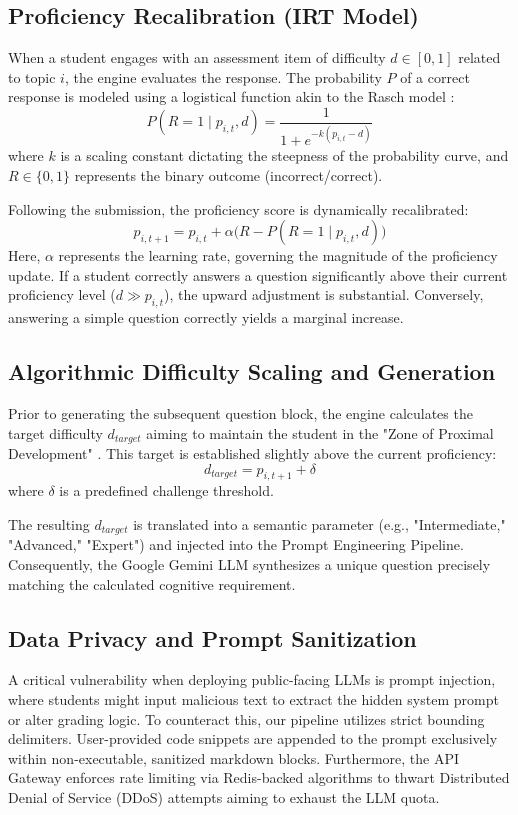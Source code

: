 \documentclass[conference]{IEEEtran}
\begin{document}
\subsection{Proficiency Recalibration (IRT Model)}
When a student engages with an assessment item of difficulty $d \in [0, 1]$ related to topic $i$, the engine evaluates the response. The probability $P$ of a correct response is modeled using a logistical function akin to the Rasch model \cite{van2013item}:
\begin{equation}
P(R=1 \mid p_{i, t}, d) = \frac{1}{1 + e^{-k(p_{i, t} - d)}}
\end{equation}
where $k$ is a scaling constant dictating the steepness of the probability curve, and $R \in \{0, 1\}$ represents the binary outcome (incorrect/correct).

Following the submission, the proficiency score is dynamically recalibrated:
\begin{equation}
p_{i, t+1} = p_{i, t} + \alpha \Big( R - P(R=1 \mid p_{i, t}, d) \Big)
\end{equation}
Here, $\alpha$ represents the learning rate, governing the magnitude of the proficiency update. If a student correctly answers a question significantly above their current proficiency level ($d \gg p_{i, t}$), the upward adjustment is substantial. Conversely, answering a simple question correctly yields a marginal increase.

\subsection{Algorithmic Difficulty Scaling and Generation}
Prior to generating the subsequent question block, the engine calculates the target difficulty $d_{target}$ aiming to maintain the student in the "Zone of Proximal Development" \cite{corbett1997knowledge}. This target is established slightly above the current proficiency:
\begin{equation}
d_{target} = p_{i, t+1} + \delta
\end{equation}
where $\delta$ is a predefined challenge threshold.

The resulting $d_{target}$ is translated into a semantic parameter (e.g., "Intermediate," "Advanced," "Expert") and injected into the Prompt Engineering Pipeline. Consequently, the Google Gemini LLM synthesizes a unique question precisely matching the calculated cognitive requirement.

\subsection{Data Privacy and Prompt Sanitization}
A critical vulnerability when deploying public-facing LLMs is prompt injection, where students might input malicious text to extract the hidden system prompt or alter grading logic. To counteract this, our pipeline utilizes strict bounding delimiters. User-provided code snippets are appended to the prompt exclusively within non-executable, sanitized markdown blocks. Furthermore, the API Gateway enforces rate limiting via Redis-backed algorithms to thwart Distributed Denial of Service (DDoS) attempts aiming to exhaust the LLM quota.
\end{document}
